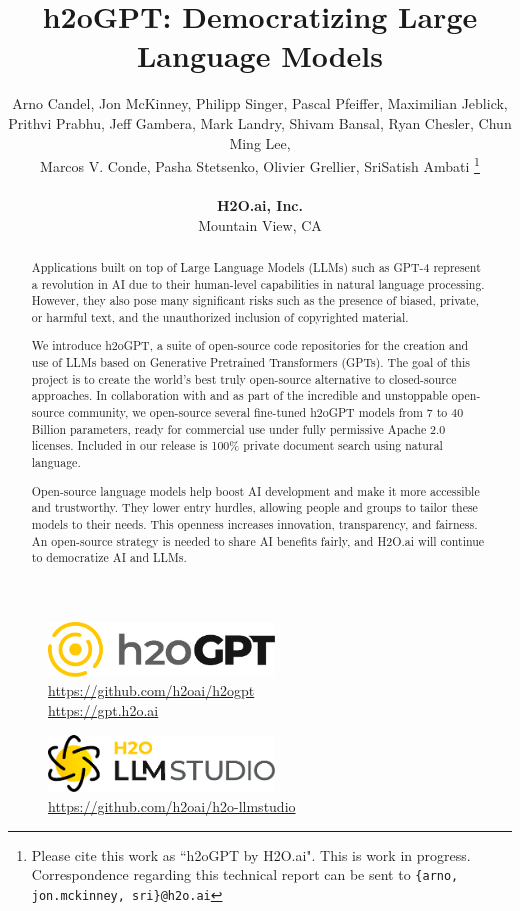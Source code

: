 \documentclass{article}
\title{h2oGPT: Democratizing Large Language Models
}
\author{
  Arno Candel, Jon McKinney, Philipp Singer, Pascal Pfeiffer, Maximilian Jeblick, \\ Prithvi Prabhu, Jeff Gambera, Mark Landry, Shivam Bansal, Ryan Chesler, Chun Ming Lee, \\ Marcos V. Conde, Pasha Stetsenko, Olivier Grellier, SriSatish Ambati
  \thanks{Please cite this work as ``h2oGPT by H2O.ai". This is work in progress. Correspondence regarding this technical report can be sent to \texttt{\{arno, jon.mckinney, sri\}@h2o.ai}}\\
  \\
  \textbf{H2O.ai, Inc.}\\
  Mountain View, CA\\
}
\begin{document}
\maketitle

\begin{figure}[h]
    \centering
    \vspace{-18pt}
    \includegraphics[width=6cm]{images/h2oGPT.pdf}\\
    \vspace{2mm}
    {\large\url{https://github.com/h2oai/h2ogpt}}\\
    {\large\url{https://gpt.h2o.ai}}\\
    \vspace{10pt}
\end{figure}

\begin{figure}[h]
    \centering
    \vspace{-10pt}
    \includegraphics[width=6cm]{images/llm-studio-logo.pdf}\\
    \vspace{2mm}
    {\large\url{https://github.com/h2oai/h2o-llmstudio}}\\
    \vspace{15pt}
\end{figure}

\begin{abstract}
Applications built on top of Large Language Models (LLMs) such as GPT-4 represent a revolution in AI due to their human-level capabilities in natural language processing. However, they also pose many significant risks such as the presence of biased, private, or harmful text, and the unauthorized inclusion of copyrighted material.

We introduce h2oGPT, a suite of open-source code repositories for the creation and use of LLMs based on Generative Pretrained Transformers (GPTs). The goal of this project is to create the world's best truly open-source alternative to closed-source approaches. In collaboration with and as part of the incredible and unstoppable open-source community, we open-source several fine-tuned h2oGPT models from 7 to 40 Billion parameters, ready for commercial use under fully permissive Apache 2.0 licenses. Included in our release is 100\% private document search using natural language.

Open-source language models help boost AI development and make it more accessible and trustworthy. They lower entry hurdles, allowing people and groups to tailor these models to their needs. This openness increases innovation, transparency, and fairness. An open-source strategy is needed to share AI benefits fairly, and H2O.ai will continue to democratize AI and LLMs.

\end{abstract}
\end{document}
